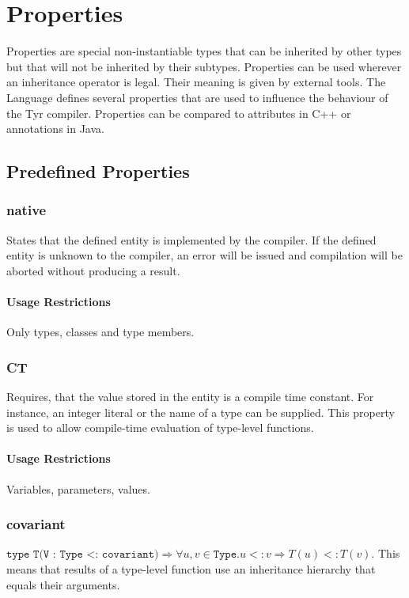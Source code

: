 \section{Properties}

Properties are special non-instantiable types that can be inherited by other types but that will not be inherited by their subtypes.
Properties can be used wherever an inheritance operator is legal.
Their meaning is given by external tools.
The Language defines several properties that are used to influence the behaviour of the Tyr compiler.
Properties can be compared to attributes in C++ or annotations in Java.

\subsection{Predefined Properties}

\subsubsection{native}
States that the defined entity is implemented by the compiler.
If the defined entity is unknown to the compiler, an error will be issued and compilation will be aborted without producing a result.

\paragraph{Usage Restrictions}
Only types, classes and type members.


\subsubsection{CT}
Requires, that the value stored in the entity is a compile time constant.
For instance, an integer literal or the name of a type can be supplied.
This property is used to allow compile-time evaluation of type-level functions.

\paragraph{Usage Restrictions}
Variables, parameters, values.


\subsubsection{covariant}
$\texttt{type T(V : Type <: covariant)} \Rightarrow \forall u,v \in \texttt{Type}. u <: v \Rightarrow T(u) <: T(v)$.
This means that results of a type-level function use an inheritance hierarchy that equals their arguments.

